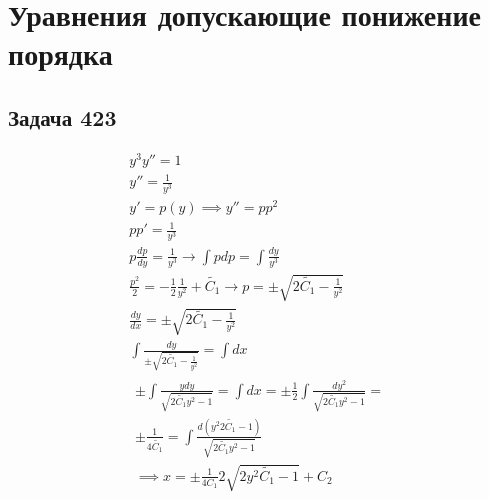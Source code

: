 \chapter{Уравнения допускающие понижение порядка}
\section{Задача 423}
\begin{gather}
  y^3 y'' = 1 \\
  y'' = \frac{1}{y^3} \\
  y' = p(y) \implies y'' = pp^2 \\
  pp' = \frac{1}{y^3} \\
  p \frac{dp}{dy} = \frac{1}{y^3} \rightarrow \int pdp = \int \frac{dy}{y^3} \\
  \frac{p^2}{2} = - \frac{1}{2} \frac{1}{y^2} + \widetilde{C_1} \rightarrow p = 
  \pm \sqrt{2 \widetilde{C_1}-\frac{1}{y^2}} \\
  \frac{dy}{dx} = \pm \sqrt{2 \widetilde{C_1} - \frac{1}{y^2}} \\
  \int \frac{dy}{\pm \sqrt{2\widetilde{C_1}-\frac{1}{y^2}}} = \int dx \\
  \begin{split}
    \pm \int \frac{ydy}{\sqrt{2\widetilde{C_1}y^2-1}} = \int dx = \pm \frac{1}{2}
    \int \frac{dy^2}{\sqrt{2 \widetilde{C_1}y^2-1}} = \\
    \pm \frac{1}{4 \widetilde{C_1}} 
    = \int \frac{d(y^2 2\widetilde{C_1}-1)}{\sqrt{2 \widetilde{C_1}y^2-1}} \\
    \implies \boxed{ x = \pm \frac{1}{4C_1} 2 \sqrt{2y^2 \widetilde{C_1} - 1} + C_2 }
  \end{split}
\end{gather}


